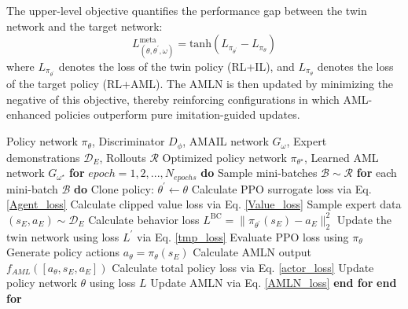 \documentclass[lettersize,journal]{IEEEtran}
\begin{document}
The upper-level objective quantifies the performance gap between the twin network and the target network:
\begin{equation}
\label{AMLN_loss}
L^{\text{meta}}_{(\theta,\theta^{\prime},\omega)}= \text{tanh}(L_{\pi_{\theta^{\prime}}}-L_{\pi_{\theta}})
\end{equation}
where $L_{\pi_{\theta^{\prime}}}$ denotes the loss of the twin policy (RL+IL), and $L_{\pi_{\theta}}$ denotes the loss of the target policy (RL+AML). The AMLN is then updated by minimizing the negative of this objective, thereby reinforcing configurations in which AML-enhanced policies outperform pure imitation-guided updates.
\begin{algorithm}[H]
\caption{algorithm of AMLN}\label{alg:AML}
\begin{algorithmic}[1]
\REQUIRE Policy network $\pi_\theta$, Discriminator $D_\phi$, AMAIL network $G_\omega$, Expert demonstrations $\mathcal{D}_E$, Rollouts $\mathcal{R}$
\ENSURE Optimized policy network $\pi_{\theta^\star}$, Learned AML network $G_{\omega^\star}$
\STATE \textbf{for} $epoch = 1,2,...,N_{epochs}$ \textbf{do}
\STATE \hspace{0.5cm}Sample mini-batches $\mathcal{B} \sim \mathcal{R} $
\STATE \hspace{0.5cm}\textbf{for} each mini-batch $\mathcal{B}$ \textbf{do}
\STATE \hspace{1cm}Clone policy: $\theta^{\prime}\leftarrow \theta$
\STATE \hspace{1cm}Calculate PPO surrogate loss via Eq. \eqref{Agent_loss}
\STATE \hspace{1cm}Calculate clipped value loss via Eq. \eqref{Value_loss}
\STATE \hspace{1cm}Sample expert data $(s_E,a_E) \sim \mathcal{D}_E$
\STATE \hspace{1cm}Calculate behavior loss $L^{\text{BC}}=\lVert \pi_{\theta^{\prime}}(s_E)-a_E \rVert_2^2$
\STATE \hspace{1cm}Update the twin network using loss $L^{\prime}$ via Eq. \eqref{tmp_loss}
\STATE \hspace{1cm}Evaluate PPO loss using $\pi_{\theta}$
\STATE \hspace{1cm}Generate policy actions $a_\theta=\pi_\theta(s_E)$
\STATE \hspace{1cm}Calculate AMLN output $f_{AML}([a_\theta,s_E,a_E])$
\STATE \hspace{1cm}Calculate total policy loss via Eq. \eqref{actor_loss}
\STATE \hspace{1cm}Update policy network $\theta$ using loss $L$
\STATE \hspace{1cm}Update AMLN via Eq. \eqref{AMLN_loss}
\STATE \hspace{0.5cm}\textbf{end for}
\STATE \textbf{end for}
\end{algorithmic}
\label{alg1}
\end{algorithm}
\end{document}
